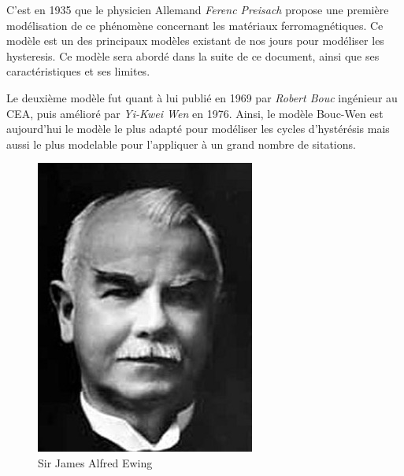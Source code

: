 \documentclass[11pt]{article}
\begin{document}
C'est en 1935 que le physicien Allemand \textit{Ferenc Preisach} propose une première modélisation de ce phénomène concernant
les matériaux ferromagnétiques. Ce modèle est un des principaux modèles existant de nos jours pour modéliser les hysteresis.
Ce modèle sera abordé dans la suite de ce document, ainsi que ses caractéristiques et ses limites.

Le deuxième modèle fut quant à lui publié en 1969 par \textit{Robert Bouc} ingénieur au CEA, puis amélioré par 
\textit{Yi-Kwei Wen} en 1976. Ainsi, le modèle Bouc-Wen est aujourd'hui le modèle le plus adapté pour modéliser
les cycles d'hystérésis mais aussi le plus modelable pour l'appliquer à un grand nombre de sitations.

\begin{figure}[H]
    \centering
    \begin{minipage}{0.2\textwidth}
      \centering
      \includegraphics[width=\textwidth]{James_A_Ewing.jpg}
      \caption{Sir James Alfred Ewing}

\end{minipage}
\end{figure}
\end{document}
